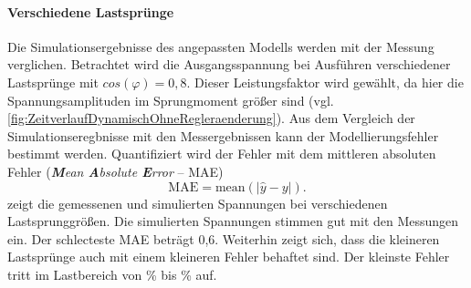 \paragraph{Verschiedene Lastsprünge}
Die Simulationsergebnisse des angepassten Modells werden mit der Messung verglichen. Betrachtet wird die Ausgangsspannung bei Ausführen verschiedener Lastsprünge mit $cos(\varphi)=0,8$. Dieser Leistungsfaktor wird gewählt, da hier die Spannungsamplituden im Sprungmoment größer sind (vgl. \cref{fig:ZeitverlaufDynamischOhneRegleraenderung}). Aus dem Vergleich der Simulationseregbnisse mit den Messergebnissen kann der Modellierungsfehler bestimmt werden. Quantifiziert wird der Fehler mit dem mittleren absoluten Fehler (\emph{\textbf{M}ean \textbf{A}bsolute \textbf{E}rror} -- MAE)
\begin{equation}
\mathrm{MAE} = \mathrm{mean}\left(\left| \hat{y} - y \right|\right).
\end{equation}
 zeigt die gemessenen und simulierten Spannungen bei verschiedenen Lastsprunggrößen. Die simulierten Spannungen stimmen gut mit den Messungen ein. Der schlecteste MAE beträgt 0,6. Weiterhin zeigt sich, dass die kleineren Lastsprünge auch mit einem kleineren Fehler behaftet sind. Der kleinste Fehler tritt im Lastbereich von \unit[50]{\%} bis \unit[100]{\%} auf.
